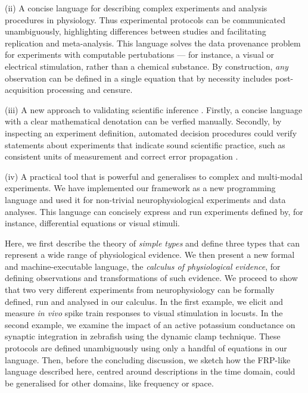 (ii) A concise language for describing complex experiments and
analysis procedures in physiology. Thus experimental protocols can be
communicated unambiguously, highlighting differences between studies
and facilitating replication and meta-analysis. This language solves
the data provenance problem \citep{Pool2002,MacKenzie-Graham2008,
  VanHorn2009} for experiments with computable pertubations --- for
instance, a visual or electrical stimulation, rather than a chemical
substance. By construction, \emph{any} observation can be defined in a
single equation that by necessity includes post-acquisition processing
and censure.

(iii) A new approach to validating scientific inference
\citep{Editors2003, Editors2010, DeSchutter2010}. Firstly, a concise
language with a clear mathematical denotation can be verfied
manually. Secondly, by inspecting an experiment definition, automated
decision procedures could verify statements about experiments that
indicate sound scientific practice, such as consistent units of
measurement \citep{Kennedy1997} and correct error propagation
\citep{Taylor1997}.

(iv) A practical tool that is powerful and generalises to complex and
multi-modal experiments. We have implemented our framework as a new
programming language and used it for non-trivial neurophysiological
experiments and data analyses. This language can concisely express and
run experiments defined by, for instance, differential equations or
visual stimuli.

Here, we first describe the theory of \emph{simple types}
\citep{Pierce2002} and define three types that can represent a wide
range of physiological evidence. We then present a new formal and
machine-executable language, the \emph{calculus of physiological
  evidence}, for defining observations and transformations of such
evidence. We proceed to show that two very different experiments from
neurophysiology can be formally defined, run and analysed in our
calculus. In the first example, we elicit and measure \emph{in vivo}
spike train responses to visual stimulation in locusts. In the second
example, we examine the impact of an active potassium conductance on
synaptic integration in zebrafish using the dynamic clamp
technique. These protocols are defined unambiguously using only a
handful of equations in our language. Then, before the concluding
discussion, we sketch how the FRP-like language described here,
centred around descriptions in the time domain, could be generalised
for other domains, like frequency or space.


